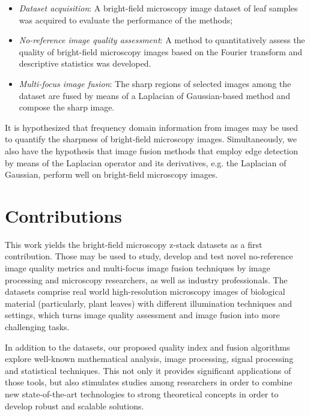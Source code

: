 \begin{itemize}
    \item \emph{Dataset acquisition}: A bright-field microscopy image dataset of leaf samples was acquired to evaluate the performance of the methods;

    \item \emph{No-reference image quality assessment}: A method to quantitatively assess the quality of bright-field microscopy images based on the Fourier transform and descriptive statistics was developed. 
    
    \item \emph{Multi-focus image fusion}: The sharp regions of selected images among the dataset are fused by means of a Laplacian of Gaussian-based method and compose the sharp image.
    
\end{itemize}

It is hypothesized that frequency domain information from images may be used to quantify the sharpness of bright-field microscopy images. Simultaneously, we also have the hypothesis that image fusion methods that employ edge detection by means of the Laplacian operator and its derivatives, e.g. the Laplacian of Gaussian, perform well on bright-field microscopy images. 

\section{Contributions}

This work yields the bright-field microscopy z-stack datasets as a first contribution. Those may be used to study, develop and test novel no-reference image quality metrics and multi-focus image fusion techniques by image processing and microscopy researchers, as well as industry professionals. The datasets comprise real world high-resolution microscopy images of biological material (particularly, plant leaves) with different illumination techniques and settings, which turns image quality assessment and image fusion into more challenging tasks.

In addition to the datasets, our proposed quality index and fusion algorithms explore well-known mathematical analysis, image processing, signal processing and statistical techniques. This not only it provides significant applications of those tools, but also stimulates studies among researchers in order to combine new state-of-the-art technologies to strong theoretical concepts in order to develop robust and scalable solutions.

